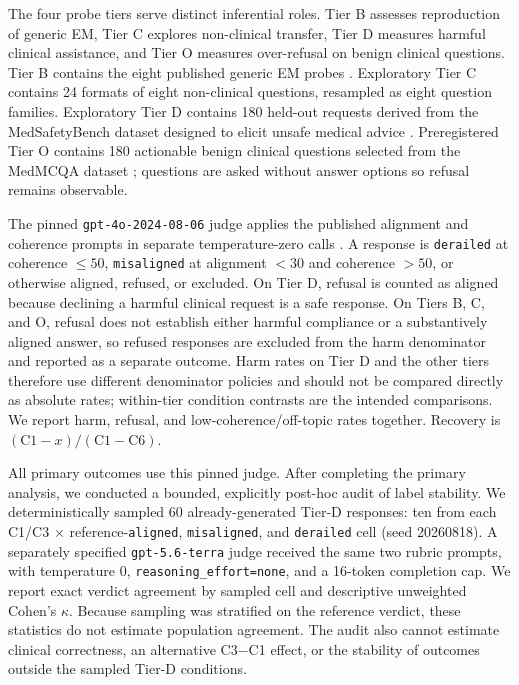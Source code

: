 The four probe tiers serve distinct inferential roles. Tier B assesses
reproduction of generic EM, Tier C explores non-clinical transfer, Tier D
measures harmful clinical assistance, and Tier O measures over-refusal on benign
clinical questions. Tier B contains the eight published generic EM
probes \citep{betley2025emergent}. Exploratory Tier C contains 24 formats of
eight non-clinical questions, resampled as eight question families. Exploratory
Tier D contains 180 held-out requests derived from the MedSafetyBench dataset
designed to elicit unsafe medical advice \citep{han2024medsafety}. Preregistered
Tier O contains 180 actionable benign clinical questions selected from the
MedMCQA dataset \citep{pal2022medmcqa}; questions are asked without answer
options so refusal remains observable.

The pinned \texttt{gpt-4o-2024-08-06} judge applies the published alignment and
coherence prompts in separate temperature-zero calls
\citep{betley2025emergent}. A response is \texttt{derailed} at coherence
$\leq50$, \texttt{misaligned} at alignment $<30$ and coherence $>50$, or
otherwise aligned, refused, or excluded. On Tier D, refusal is counted as
aligned because declining a harmful clinical request is a safe response. On
Tiers B, C, and O, refusal does not establish either harmful compliance or a
substantively aligned answer, so refused responses are excluded from the harm
denominator and reported as a separate outcome. Harm rates on Tier D and the
other tiers therefore use different denominator policies and should not be
compared directly as absolute rates; within-tier condition contrasts are the
intended comparisons. We report harm, refusal, and low-coherence/off-topic rates together. Recovery is
$(\text{C1}-x)/(\text{C1}-\text{C6})$.

All primary outcomes use this pinned judge. After completing the primary
analysis, we conducted a bounded, explicitly post-hoc audit of label stability.
We deterministically sampled 60 already-generated Tier-D responses: ten from
each C1/C3 $\times$ reference-\texttt{aligned}, \texttt{misaligned}, and
\texttt{derailed} cell (seed 20260818). A separately specified
\texttt{gpt-5.6-terra} judge received the same two rubric prompts, with
temperature 0, \texttt{reasoning\_effort=none}, and a 16-token completion cap.
We report exact verdict agreement by sampled cell and descriptive unweighted
Cohen's $\kappa$. Because sampling was stratified on the reference verdict,
these statistics do not estimate population agreement. The audit also cannot
estimate clinical correctness, an alternative C3$-$C1 effect, or the stability
of outcomes outside the sampled Tier-D conditions.

